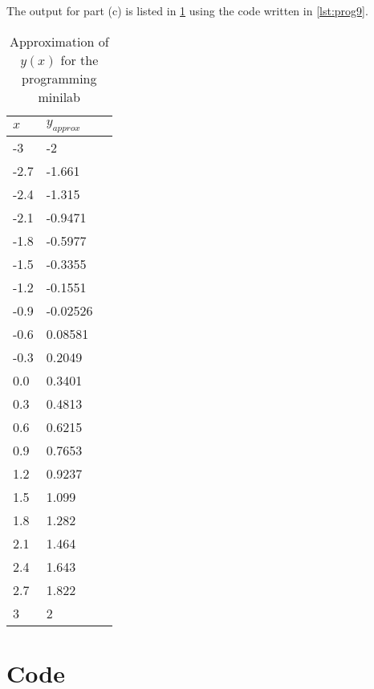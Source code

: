 \documentclass[12pt]{article}
\begin{document}
The output for part (c) is listed in \cref{tab:minilab_data}
using the code written in \cref{lst:prog9}.

\begin{table}[hp]
  \centering
  \begin{tabularx}{.5\textwidth}{XXX}
    \hline
    $x$ & $y_{approx}$ \\
    \hline
    -3   &        -2    \\
    -2.7   &    -1.661  \\
    -2.4   &    -1.315  \\
    -2.1   &   -0.9471  \\
    -1.8   &   -0.5977  \\
    -1.5   &   -0.3355  \\
    -1.2   &   -0.1551  \\
    -0.9   &  -0.02526  \\
    -0.6   &   0.08581  \\
    -0.3   &    0.2049  \\
    0.0   &    0.3401   \\
    0.3   &    0.4813   \\
    0.6   &    0.6215  \\
    0.9   &    0.7653  \\
    1.2   &    0.9237  \\
    1.5   &     1.099  \\
    1.8   &     1.282  \\
    2.1   &     1.464  \\
    2.4   &     1.643  \\
    2.7   &     1.822  \\
    3   &         2  \\
    \hline           
  \end{tabularx}
  \caption{Approximation of $y(x)$ for the programming minilab}
  \label{tab:minilab_data}
\end{table}

\pagebreak
\section{Code}
  
  
  
\end{document}

